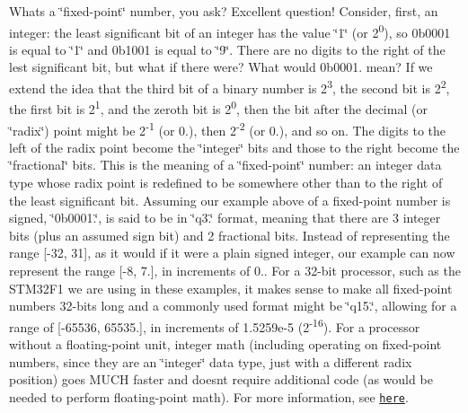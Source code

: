 What\textquotesingle{}s a \char`\"{}fixed-\/point\char`\"{} number, you ask? Excellent question! Consider, first, an integer\+: the least significant bit of an integer has the value \char`\"{}1\char`\"{} (or 2\textsuperscript{0}), so 0b0001 is equal to \char`\"{}1\char`\"{} and 0b1001 is equal to \char`\"{}9\char`\"{}. There are no digits to the right of the lest significant bit, but what if there were? What would 0b0001. mean? If we extend the idea that the third bit of a binary number is 2\textsuperscript{3}, the second bit is 2\textsuperscript{2}, the first bit is 2\textsuperscript{1}, and the zeroth bit is 2\textsuperscript{0}, then the bit after the decimal (or \char`\"{}radix\char`\"{}) point might be 2\textsuperscript{-\/1} (or 0.), then 2\textsuperscript{-\/2} (or 0.), and so on. The digits to the left of the radix point become the \char`\"{}integer\char`\"{} bits and those to the right become the \char`\"{}fractional\char`\"{} bits. This is the meaning of a \char`\"{}fixed-\/point\char`\"{} number\+: an integer data type whose radix point is redefined to be somewhere other than to the right of the least significant bit. Assuming our example above of a fixed-\/point number is signed, \char`\"{}0b0001.\char`\"{}, is said to be in \char`\"{}q3.\char`\"{} format, meaning that there are 3 integer bits (plus an assumed sign bit) and 2 fractional bits. Instead of representing the range \mbox{[}-\/32, 31\mbox{]}, as it would if it were a plain signed integer, our example can now represent the range \mbox{[}-\/8, 7.\mbox{]}, in increments of 0.. For a 32-\/bit processor, such as the S\+T\+M32\+F1 we are using in these examples, it makes sense to make all fixed-\/point numbers 32-\/bits long and a commonly used format might be \char`\"{}q15.\char`\"{}, allowing for a range of \mbox{[}-\/65536, 65535.\mbox{]}, in increments of 1.\+5259e-\/5 (2\textsuperscript{-\/16}). For a processor without a floating-\/point unit, integer math (including operating on fixed-\/point numbers, since they are an \char`\"{}integer\char`\"{} data type, just with a different radix position) goes M\+U\+CH faster and doesn\textquotesingle{}t require additional code (as would be needed to perform floating-\/point math). For more information, see \href{https://developer.arm.com/documentation/dai0033/a/}{\tt here}.

